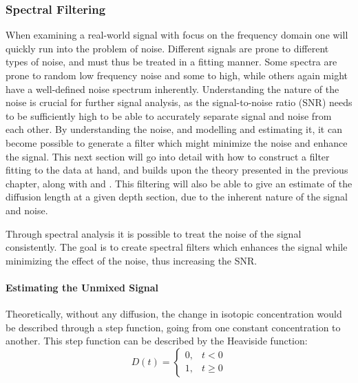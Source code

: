 \documentclass[../../CompleteThesis2/Complete_2ndDraft]{subfiles}
\begin{document}
\subsubsection[Spectral Filtering][Spectral Filtering]{Spectral Filtering}
\label{Subsubsec:SignalAnalysis_BackDiffusion_SpectralFiltering}


When examining a real-world signal with focus on the frequency domain one will quickly run into the problem of noise. Different signals are prone to different types of noise, and must thus be treated in a fitting manner. Some spectra are prone to random low frequency noise and some to high, while others again might have a well-defined noise spectrum inherently. Understanding the nature of the noise is crucial for further signal analysis, as the signal-to-noise ratio (SNR) needs to be sufficiently high to be able to accurately separate signal and noise from each other. By understanding the noise, and modelling and estimating it, it can become possible to generate a filter which might minimize the noise and enhance the signal. This next section will go into detail with how to construct a filter fitting to the data at hand, and builds upon the theory presented in the previous chapter, along with \cite{Johnsen2000a} and \cite{Rasmussen2014}. This filtering will also be able to give an estimate of the diffusion length at a given depth section, due to the inherent nature of the signal and noise.

%

Through spectral analysis it is possible to treat the noise of the signal consistently. The goal is to create spectral filters which enhances the signal while minimizing the effect of the noise, thus increasing the SNR.

\paragraph{Estimating the Unmixed Signal} Theoretically, without any diffusion, the change in isotopic concentration would be described through a step function, going from one constant concentration to another. This step function can be described by the Heaviside function:
\begin{equation}
	D(t) = \begin{cases}
		0, & t < 0 \\
		1, & t \geq 0
	\end{cases}
\end{equation}
\end{document}
